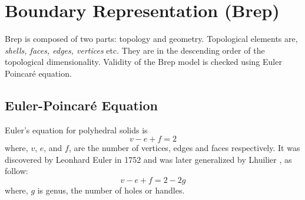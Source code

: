 \section{Boundary Representation (Brep)}
Brep is composed of two parts: topology and geometry. Topological elements are, {\em shells, faces, edges, vertices} etc. They are in the descending order of the topological dimensionality.  Validity of the Brep model is checked using Euler Poincar\'e equation.




%
%

	
\subsection{Euler-Poincar\'e Equation}
Euler's equation for polyhedral solids is $$v - e + f = 2$$ where, $v$, $e$, and $f$, are the number of vertices, edges and faces respectively. It was discovered by Leonhard Euler in 1752 and was later generalized by Lhuilier \cite{Krishnamurti2002} , as follow: $$v - e + f = 2 - 2g$$ where, $g$ is genus, the number of holes or handles.

